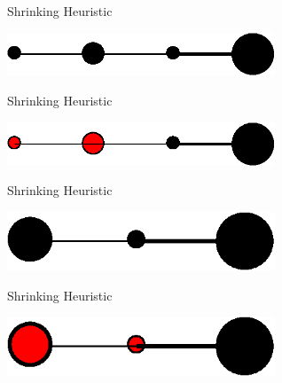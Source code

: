 \documentclass[10pt]{beamer}
\begin{document}
\begin{frame}{Shrinking Heuristic}
\begin{example}
    \begin{center}
            \includegraphics[width=8cm]{Shrinking09.eps} 
    \end{center}
\end{example}
\end{frame}

\begin{frame}{Shrinking Heuristic}
\begin{example}
    \begin{center}
            \includegraphics[width=8cm]{Shrinking10.eps} 
    \end{center}
\end{example}
\end{frame}

\begin{frame}{Shrinking Heuristic}
\begin{example}
    \begin{center}
            \includegraphics[width=8cm]{Shrinking11.eps} 
    \end{center}
\end{example}
\end{frame}

\begin{frame}{Shrinking Heuristic}
\begin{example}
    \begin{center}
            \includegraphics[width=8cm]{Shrinking12.eps} 
    \end{center}
\end{example}
\end{frame}
\end{document}
